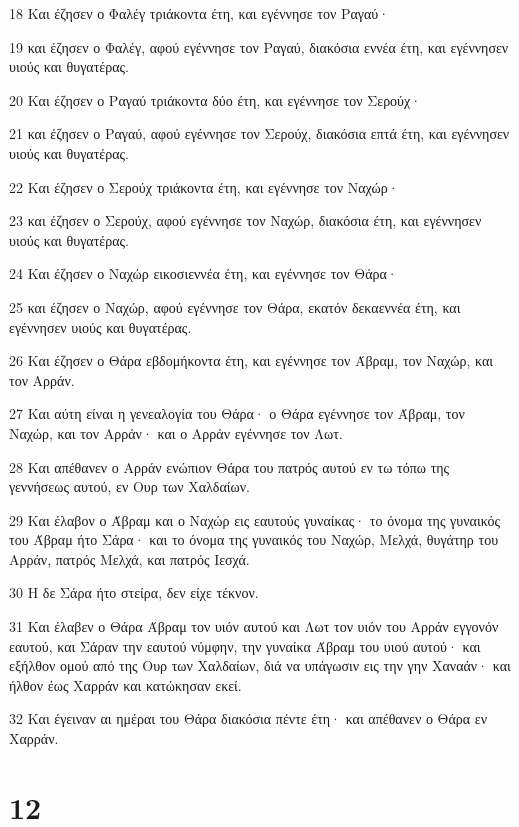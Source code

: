 \par 18 Και έζησεν ο Φαλέγ τριάκοντα έτη, και εγέννησε τον Ραγαύ·
\par 19 και έζησεν ο Φαλέγ, αφού εγέννησε τον Ραγαύ, διακόσια εννέα έτη, και εγέννησεν υιούς και θυγατέρας.
\par 20 Και έζησεν ο Ραγαύ τριάκοντα δύο έτη, και εγέννησε τον Σερούχ·
\par 21 και έζησεν ο Ραγαύ, αφού εγέννησε τον Σερούχ, διακόσια επτά έτη, και εγέννησεν υιούς και θυγατέρας.
\par 22 Και έζησεν ο Σερούχ τριάκοντα έτη, και εγέννησε τον Ναχώρ·
\par 23 και έζησεν ο Σερούχ, αφού εγέννησε τον Ναχώρ, διακόσια έτη, και εγέννησεν υιούς και θυγατέρας.
\par 24 Και έζησεν ο Ναχώρ εικοσιεννέα έτη, και εγέννησε τον Θάρα·
\par 25 και έζησεν ο Ναχώρ, αφού εγέννησε τον Θάρα, εκατόν δεκαεννέα έτη, και εγέννησεν υιούς και θυγατέρας.
\par 26 Και έζησεν ο Θάρα εβδομήκοντα έτη, και εγέννησε τον Άβραμ, τον Ναχώρ, και τον Αρράν.
\par 27 Και αύτη είναι η γενεαλογία του Θάρα· ο Θάρα εγέννησε τον Άβραμ, τον Ναχώρ, και τον Αρράν· και ο Αρράν εγέννησε τον Λωτ.
\par 28 Και απέθανεν ο Αρράν ενώπιον Θάρα του πατρός αυτού εν τω τόπω της γεννήσεως αυτού, εν Ουρ των Χαλδαίων.
\par 29 Και έλαβον ο Άβραμ και ο Ναχώρ εις εαυτούς γυναίκας· το όνομα της γυναικός του Άβραμ ήτο Σάρα· και το όνομα της γυναικός του Ναχώρ, Μελχά, θυγάτηρ του Αρράν, πατρός Μελχά, και πατρός Ιεσχά.
\par 30 Η δε Σάρα ήτο στείρα, δεν είχε τέκνον.
\par 31 Και έλαβεν ο Θάρα Άβραμ τον υιόν αυτού και Λωτ τον υιόν του Αρράν εγγονόν εαυτού, και Σάραν την εαυτού νύμφην, την γυναίκα Άβραμ του υιού αυτού· και εξήλθον ομού από της Ουρ των Χαλδαίων, διά να υπάγωσιν εις την γην Χαναάν· και ήλθον έως Χαρράν και κατώκησαν εκεί.
\par 32 Και έγειναν αι ημέραι του Θάρα διακόσια πέντε έτη· και απέθανεν ο Θάρα εν Χαρράν.

\chapter{12}

